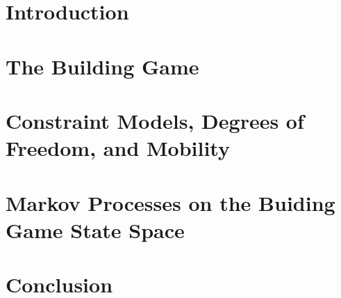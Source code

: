 \documentclass[12pt,twoside]{report}  %
\begin{document}
\chapter{Introduction}

\clearpage{\pagestyle{empty}\cleardoublepage}

\chapter{The Building Game}

\clearpage{\pagestyle{empty}\cleardoublepage}

\chapter{Constraint Models, Degrees of Freedom, and Mobility}

\clearpage{\pagestyle{empty}\cleardoublepage}

\chapter{Markov Processes on the Buiding Game State Space}

\clearpage{\pagestyle{empty}\cleardoublepage}


\chapter{Conclusion}

\clearpage{\pagestyle{empty}\cleardoublepage}

%
%
%



\begin{spacing}{0.9}
  
\end{spacing}
\end{document}
